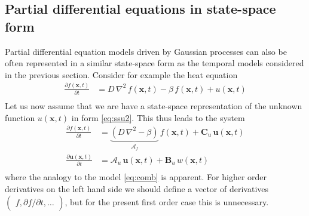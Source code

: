 \documentclass[journal]{IEEEtran}
\begin{document}
\subsection{Partial differential equations in state-space form}
%
Partial differential equation models driven by Gaussian processes can also be often represented in a similar state-space form as the temporal models considered in the previous section. Consider for example the heat equation
%
\begin{equation}
\begin{split}
  \frac{\partial f(\mathbf{x},t)}{\partial t} &=
  D \, \nabla^2 \, f(\mathbf{x},t) - \beta \, f(\mathbf{x},t) + u(\mathbf{x},t) \\
\end{split}
\end{equation}
%
Let us now assume that we are have a state-space representation of the unknown function $u(\mathbf{x},t)$ in form \eqref{eq:ssu2}. This thus leads to the system
%
\begin{equation}
\begin{split}
  \frac{\partial f(\mathbf{x},t)}{\partial t} &=
  \underbrace{\left( D \, \nabla^2 - \beta \right)}_{\mathbf{\mathcal{A}}_f} \, f(\mathbf{x},t) + \mathbf{C}_u \, \mathbf{u}(\mathbf{x},t) \\
  \frac{\partial\mathbf{u}(\mathbf{x},t)}{\partial t} &= \mathbf{\mathcal{A}}_u \, \mathbf{u}(\mathbf{x},t)
  + \mathbf{B}_u \, w(\mathbf{x},t) \\
\end{split}
\end{equation}
%
where the analogy to the model \eqref{eq:comb} is apparent. For higher order derivatives on the left hand side we should define a vector of derivatives $\begin{pmatrix} f, \partial f/\partial t, \ldots \end{pmatrix}$, but for the present first order case this is unnecessary.
\end{document}

